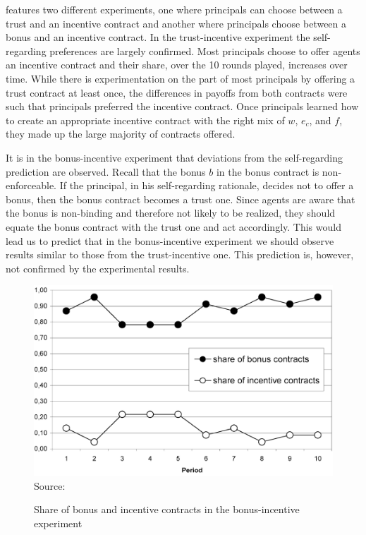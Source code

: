 \documentclass[12pt]{article}
\begin{document}
\cite{fehr2007fairness} features two different experiments, one where principals can choose between a trust and an incentive contract and another where principals choose between a bonus and an incentive contract. In the trust-incentive experiment the self-regarding preferences are largely confirmed. Most principals choose to offer agents an incentive contract and their share, over the 10 rounds played, increases over time. While there is experimentation on the part of most principals by offering a trust contract at least once, the differences in payoffs from both contracts were such that principals preferred the incentive contract. Once principals learned how to create an appropriate incentive contract with the right mix of $w$, $e_c$, and $f$, they made up the large majority of contracts offered.

It is in the bonus-incentive experiment that deviations from the self-regarding prediction are observed. Recall that the bonus $b$ in the bonus contract is non-enforceable. If the principal, in his self-regarding rationale, decides not to offer a bonus, then the bonus contract becomes a trust one. Since agents are aware that the bonus is non-binding and therefore not likely to be realized, they should equate the bonus contract with the trust one and act accordingly. This would lead us to predict that in the bonus-incentive experiment we should observe results similar to those from the trust-incentive one. This prediction is, however, not confirmed by the experimental results.

\begin{figure}[H]
	\centering
	\caption{Share of bonus and incentive contracts in the bonus-incentive experiment}	
	\includegraphics[width=1.\textwidth]{bonusincentive.png}
	 Source: \cite{fehr2007fairness}
	\label{fig:bonusincentive}
\end{figure}
\end{document}
